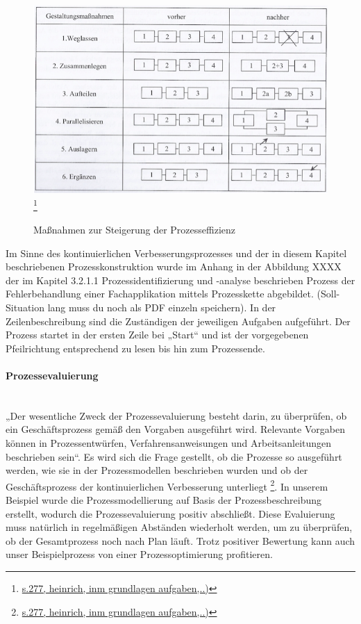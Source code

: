 \documentclass[a4paper, 12pt]{scrreprt}
\begin{document}
\begin{figure}[h!]
	\centering
	\includegraphics[width=15cm]{bilder_olli/prozesseffizienz}
		\footnote{\url{s.277, heinrich, inm grundlagen aufgaben,..)}}
	\caption{Maßnahmen zur Steigerung der Prozesseffizienz}
	\label{mzsdp}
\end{figure}


Im Sinne des kontinuierlichen Verbesserungsprozesses und der in diesem Kapitel beschriebenen Prozesskonstruktion wurde im Anhang in der Abbildung XXXX der im Kapitel 3.2.1.1 Prozessidentifizierung und -analyse beschrieben Prozess der Fehlerbehandlung einer Fachapplikation mittels Prozesskette abgebildet. (Soll-Situation lang muss du noch als PDF einzeln speichern). In der Zeilenbeschreibung sind die Zuständigen der jeweiligen Aufgaben aufgeführt. Der Prozess startet in der ersten Zeile bei „Start“ und ist der vorgegebenen Pfeilrichtung entsprechend zu lesen bis hin zum Prozessende.

\paragraph{Prozessevaluierung}\mbox{}\\
„Der wesentliche Zweck der Prozessevaluierung besteht darin, zu überprüfen, ob ein Geschäftsprozess gemäß den Vorgaben ausgeführt wird. Relevante Vorgaben können in Prozessentwürfen, Verfahrensanweisungen und Arbeitsanleitungen  beschrieben sein“. Es wird sich die Frage gestellt, ob die Prozesse so ausgeführt werden, wie sie in der Prozessmodellen beschrieben wurden und ob der Geschäftsprozess der kontinuierlichen Verbesserung unterliegt \footnote{\url{s.277, heinrich, inm grundlagen aufgaben,..)}}. In unserem Beispiel wurde die Prozessmodellierung auf Basis der Prozessbeschreibung erstellt, wodurch die Prozessevaluierung positiv abschließt. Diese Evaluierung muss natürlich in regelmäßigen Abständen wiederholt werden, um zu überprüfen, ob der Gesamtprozess noch nach Plan läuft. Trotz positiver Bewertung kann auch unser Beispielprozess von einer Prozessoptimierung profitieren.
\end{document}
